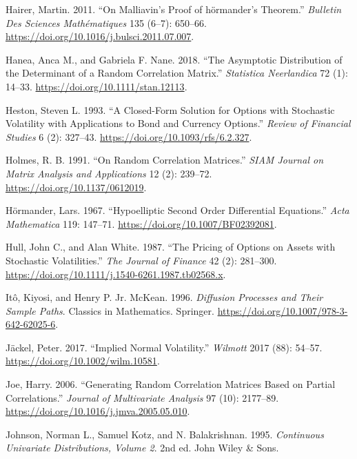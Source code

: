 \documentclass[
  english,
  11pt,
  letterpaper,
  DIV=11,
  numbers=noendperiod]{scrartcl}
\newlength{\cslhangindent}
\newenvironment{CSLReferences}[2] %
 {\begin{list}{}{%
  \setlength{\itemindent}{0pt}
  \setlength{\leftmargin}{0pt}
  \setlength{\parsep}{0pt}
  \ifodd #1
   \setlength{\leftmargin}{\cslhangindent}
   \setlength{\itemindent}{-1\cslhangindent}
  \fi
  \setlength{\itemsep}{#2\baselineskip}}}
 {\end{list}}
\theoremstyle{plain}
\theoremstyle{plain}
\theoremstyle{plain}
\theoremstyle{plain}
\theoremstyle{remark}
\begin{document}
\begin{CSLReferences}{1}{1}
Hairer, Martin. 2011. {``On Malliavin's Proof of h{ö}rmander's
Theorem.''} \emph{Bulletin Des Sciences Math{é}matiques} 135 (6--7):
650--66. \url{https://doi.org/10.1016/j.bulsci.2011.07.007}.

Hanea, Anca M., and Gabriela F. Nane. 2018. {``The Asymptotic
Distribution of the Determinant of a Random Correlation Matrix.''}
\emph{Statistica Neerlandica} 72 (1): 14--33.
\url{https://doi.org/10.1111/stan.12113}.

Heston, Steven L. 1993. {``A Closed-Form Solution for Options with
Stochastic Volatility with Applications to Bond and Currency Options.''}
\emph{Review of Financial Studies} 6 (2): 327--43.
\url{https://doi.org/10.1093/rfs/6.2.327}.

Holmes, R. B. 1991. {``On Random Correlation Matrices.''} \emph{SIAM
Journal on Matrix Analysis and Applications} 12 (2): 239--72.
\url{https://doi.org/10.1137/0612019}.

Hörmander, Lars. 1967. {``Hypoelliptic Second Order Differential
Equations.''} \emph{Acta Mathematica} 119: 147--71.
\url{https://doi.org/10.1007/BF02392081}.

Hull, John C., and Alan White. 1987. {``The Pricing of Options on Assets
with Stochastic Volatilities.''} \emph{The Journal of Finance} 42 (2):
281--300. \url{https://doi.org/10.1111/j.1540-6261.1987.tb02568.x}.

Itô, Kiyosi, and Henry P. Jr. McKean. 1996. \emph{Diffusion Processes
and Their Sample Paths}. Classics in Mathematics. Springer.
\url{https://doi.org/10.1007/978-3-642-62025-6}.

Jäckel, Peter. 2017. {``Implied Normal Volatility.''} \emph{Wilmott}
2017 (88): 54--57. \url{https://doi.org/10.1002/wilm.10581}.

Joe, Harry. 2006. {``Generating Random Correlation Matrices Based on
Partial Correlations.''} \emph{Journal of Multivariate Analysis} 97
(10): 2177--89. \url{https://doi.org/10.1016/j.jmva.2005.05.010}.

Johnson, Norman L., Samuel Kotz, and N. Balakrishnan. 1995.
\emph{Continuous Univariate Distributions, Volume 2}. 2nd ed. John Wiley
\& Sons.


\end{CSLReferences}
\end{document}
